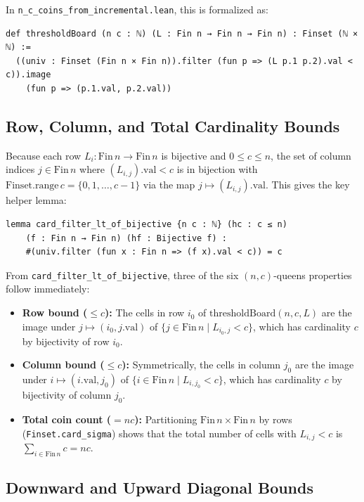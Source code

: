 \documentclass[11pt,a4paper]{article}
\theoremstyle{remark}
\begin{document}
In \texttt{n\_c\_coins\_from\_incremental.lean}, this is formalized as:
\begin{lstlisting}[language=Lean4]
def thresholdBoard (n c : ℕ) (L : Fin n → Fin n → Fin n) : Finset (ℕ × ℕ) :=
  ((univ : Finset (Fin n × Fin n)).filter (fun p => (L p.1 p.2).val < c)).image
    (fun p => (p.1.val, p.2.val))
\end{lstlisting}

\subsection{Row, Column, and Total Cardinality Bounds}

Because each row $L_i : \mathrm{Fin}\,n \to \mathrm{Fin}\,n$ is bijective and $0 \le c \le n$, the set of column indices $j \in \mathrm{Fin}\,n$ where $(L_{i,j}).\mathrm{val} < c$ is in bijection with $\mathrm{Finset.range}\,c = \{0, 1, \dots, c-1\}$ via the map $j \mapsto (L_{i,j}).\mathrm{val}$. This gives the key helper lemma:
\begin{lstlisting}[language=Lean4]
lemma card_filter_lt_of_bijective {n c : ℕ} (hc : c ≤ n)
    (f : Fin n → Fin n) (hf : Bijective f) :
    #(univ.filter (fun x : Fin n => (f x).val < c)) = c
\end{lstlisting}
From \texttt{card\_filter\_lt\_of\_bijective}, three of the six $(n,c)$-queens properties follow immediately:
\begin{itemize}[nosep]
  \item \textbf{Row bound ($\le c$):} The cells in row $i_0$ of $\mathrm{thresholdBoard}(n, c, L)$ are the image under $j \mapsto (i_0, j.\mathrm{val})$ of $\{j \in \mathrm{Fin}\,n \mid L_{i_0, j} < c\}$, which has cardinality $c$ by bijectivity of row $i_0$.
  \item \textbf{Column bound ($\le c$):} Symmetrically, the cells in column $j_0$ are the image under $i \mapsto (i.\mathrm{val}, j_0)$ of $\{i \in \mathrm{Fin}\,n \mid L_{i, j_0} < c\}$, which has cardinality $c$ by bijectivity of column $j_0$.
  \item \textbf{Total coin count ($= nc$):} Partitioning $\mathrm{Fin}\,n \times \mathrm{Fin}\,n$ by rows (\texttt{Finset.card\_sigma}) shows that the total number of cells with $L_{i,j} < c$ is $\sum_{i \in \mathrm{Fin}\,n} c = nc$.
\end{itemize}

\subsection{Downward and Upward Diagonal Bounds}
\end{document}
